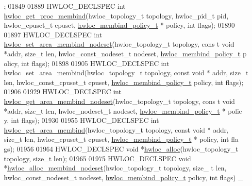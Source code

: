 \begin{DoxyCode}
      ;
01849 
01889 HWLOC\_DECLSPEC \textcolor{keywordtype}{int} \hyperlink{a00050_gabaf9c13f1fa301d6895594cec52226e2}{hwloc_get_proc_membind}(hwloc\_topology\_t topology, hwloc\_pid\_t 
      pid, hwloc\_cpuset\_t cpuset, \hyperlink{a00050_gac9764f79505775d06407b40f5e4661e8}{hwloc_membind_policy_t} * policy, \textcolor{keywordtype}{int} flags);
01890 
01897 HWLOC\_DECLSPEC \textcolor{keywordtype}{int} \hyperlink{a00050_gade5e2c28ea8475a479bf2b1df36c6ccd}{hwloc_set_area_membind_nodeset}(hwloc\_topology\_t topology, \textcolor{keyword}{cons
      t} \textcolor{keywordtype}{void} *addr, \textcolor{keywordtype}{size\_t} len, hwloc\_const\_nodeset\_t nodeset, \hyperlink{a00050_gac9764f79505775d06407b40f5e4661e8}{hwloc_membind_policy_t} p
      olicy, \textcolor{keywordtype}{int} flags);
01898 
01905 HWLOC\_DECLSPEC \textcolor{keywordtype}{int} \hyperlink{a00050_ga06594edeb4728cb9e014aed924d1e74a}{hwloc_set_area_membind}(hwloc\_topology\_t topology, \textcolor{keyword}{const} \textcolor{keywordtype}{void} *
      addr, \textcolor{keywordtype}{size\_t} len, hwloc\_const\_cpuset\_t cpuset, \hyperlink{a00050_gac9764f79505775d06407b40f5e4661e8}{hwloc_membind_policy_t} policy, \textcolor{keywordtype}{int
      } flags);
01906 
01929 HWLOC\_DECLSPEC \textcolor{keywordtype}{int} \hyperlink{a00050_ga106e6fcd764d17be682faf7a5bc95720}{hwloc_get_area_membind_nodeset}(hwloc\_topology\_t topology, \textcolor{keyword}{cons
      t} \textcolor{keywordtype}{void} *addr, \textcolor{keywordtype}{size\_t} len, hwloc\_nodeset\_t nodeset, \hyperlink{a00050_gac9764f79505775d06407b40f5e4661e8}{hwloc_membind_policy_t} * polic
      y, \textcolor{keywordtype}{int} flags);
01930 
01955 HWLOC\_DECLSPEC \textcolor{keywordtype}{int} \hyperlink{a00050_gac02ee8f7606382ea7855ae4e1656ed0f}{hwloc_get_area_membind}(hwloc\_topology\_t topology, \textcolor{keyword}{const} \textcolor{keywordtype}{void} *
      addr, \textcolor{keywordtype}{size\_t} len, hwloc\_cpuset\_t cpuset, \hyperlink{a00050_gac9764f79505775d06407b40f5e4661e8}{hwloc_membind_policy_t} * policy, \textcolor{keywordtype}{int} fla
      gs);
01956 
01964 HWLOC\_DECLSPEC \textcolor{keywordtype}{void} *\hyperlink{a00050_gac5586e58cf25c3596b7d4aa31ce13259}{hwloc_alloc}(hwloc\_topology\_t topology, \textcolor{keywordtype}{size\_t} len);
01965 
01975 HWLOC\_DECLSPEC \textcolor{keywordtype}{void} *\hyperlink{a00050_gaeaa00714a9c4319bda0a74ca6f8720e8}{hwloc_alloc_membind_nodeset}(hwloc\_topology\_t topology, \textcolor{keywordtype}{size\_
      t} len, hwloc\_const\_nodeset\_t nodeset, \hyperlink{a00050_gac9764f79505775d06407b40f5e4661e8}{hwloc_membind_policy_t} policy, \textcolor{keywordtype}{int} flags) \_

\end{DoxyCode}
